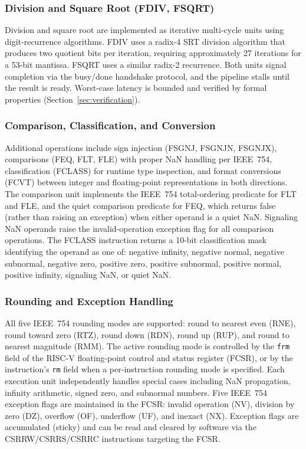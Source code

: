 \documentclass[journal]{IEEEtran}
\begin{document}
\subsubsection{Division and Square Root (FDIV, FSQRT)}
Division and square root are implemented as iterative multi-cycle units
using digit-recurrence algorithms.  FDIV uses a radix-4 SRT division
algorithm that produces two quotient bits per iteration, requiring
approximately 27 iterations for a 53-bit mantissa.  FSQRT uses a similar
radix-2 recurrence.  Both units signal completion via the busy/done
handshake protocol, and the pipeline stalls until the result is ready.
Worst-case latency is bounded and verified by formal properties
(Section~\ref{sec:verification}).

\subsubsection{Comparison, Classification, and Conversion}
Additional operations include sign injection (FSGNJ, FSGNJN, FSGNJX),
comparisons (FEQ, FLT, FLE) with proper NaN handling per IEEE~754,
classification (FCLASS) for runtime type inspection, and format
conversions (FCVT) between integer and floating-point representations in
both directions.  The comparison unit implements the IEEE~754
total-ordering predicate for FLT and FLE, and the quiet comparison
predicate for FEQ, which returns false (rather than raising an exception)
when either operand is a quiet NaN.  Signaling NaN operands raise the
invalid-operation exception flag for all comparison operations.  The
FCLASS instruction returns a 10-bit classification mask identifying the
operand as one of: negative infinity, negative normal, negative
subnormal, negative zero, positive zero, positive subnormal, positive
normal, positive infinity, signaling NaN, or quiet NaN.

\subsubsection{Rounding and Exception Handling}
All five IEEE~754 rounding modes are supported: round
to nearest even (RNE), round toward zero (RTZ), round down (RDN), round
up (RUP), and round to nearest magnitude (RMM).  The active rounding
mode is controlled by the \texttt{frm} field of the RISC-V
floating-point control and status register (FCSR), or by the
instruction's \texttt{rm} field when a per-instruction rounding mode is
specified.  Each execution unit
independently handles special cases including NaN propagation, infinity
arithmetic, signed zero, and subnormal numbers.  Five IEEE~754 exception
flags are maintained in the FCSR: invalid operation (NV), division by
zero (DZ), overflow (OF), underflow (UF), and inexact (NX).  Exception
flags are accumulated (sticky) and can be read and cleared by software
via the CSRRW/CSRRS/CSRRC instructions targeting the FCSR.
\end{document}
